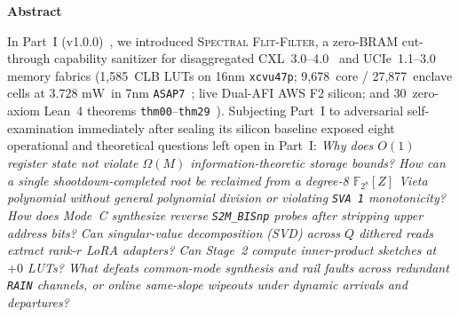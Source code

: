 \documentclass[10pt,twocolumn]{article}
\renewenvironment{abstract}{%
  \par\vspace{2pt}%
  \begin{center}%
  \begin{minipage}{0.95\textwidth}%
  \noindent{\color{black!55}\hrule height 0.4pt}\vspace{4pt}%
  \centerline{\bfseries\small Abstract}\vspace{3pt}%
  \fontsize{9.0}{11.0}\selectfont
  \setlength{\parskip}{0.36\baselineskip}%
  \setlength{\parindent}{0pt}%
}{%
  \par\vspace{4pt}\noindent{\color{black!55}\hrule height 0.4pt}%
  \end{minipage}%
  \end{center}%
  \vspace{2pt}%
}
\providecommand{\BaselineVersion}{v1.0.0}
\providecommand{\LeanPartOneTotal}{30}
\providecommand{\CoreClbLuts}{1,585}
\providecommand{\AsicCoreCells}{9,678}
\providecommand{\AsicStandardCells}{27,877}
\providecommand{\AsicTotalPowerMw}{\ensuremath{3.728\text{~mW}}}
\theoremstyle{spectralthm}
\begin{document}
\begin{abstract}
In Part~I (\BaselineVersion)~\cite{murphy2026part1}, we introduced \textsc{Spectral Flit-Filter}, a zero-BRAM cut-through capability sanitizer for disaggregated \mbox{CXL~3.0--4.0}~\cite{cxl2025spec,dassharma2024cxl} and \mbox{UCIe~1.1--3.0}~\cite{ucie2025spec30} memory fabrics (\CoreClbLuts\ CLB LUTs on 16nm \texttt{xcvu47p}; \AsicCoreCells\ core / \AsicStandardCells\ enclave cells at \AsicTotalPowerMw\ in 7nm \texttt{ASAP7}~\cite{clark2016asap7}; live Dual-AFI AWS F2 silicon; and \LeanPartOneTotal\ zero-axiom Lean~4 theorems \texttt{thm00}--\texttt{thm29}~\cite{demoura2021lean4}). Subjecting Part~I to adversarial self-examination immediately after sealing its silicon baseline exposed eight operational and theoretical questions left open in Part~I: \emph{Why does $O(1)$ register state not violate $\Omega(M)$ information-theoretic storage bounds? How can a single shootdown-completed root be reclaimed from a degree-8 $\mathbb{F}_{2^8}[Z]$ Vieta polynomial without general polynomial division or violating \texttt{SVA 1} monotonicity? How does Mode~C synthesize reverse \texttt{S2M\_BISnp} probes after stripping upper address bits? Can singular-value decomposition (SVD) across $Q$ dithered reads extract rank-$r$ LoRA adapters? Can Stage~2 compute inner-product sketches at $+0$ LUTs? What defeats common-mode synthesis and rail faults across redundant \texttt{RAIN} channels, or online same-slope wipeouts under dynamic arrivals and departures?}


\end{abstract}
\end{document}
